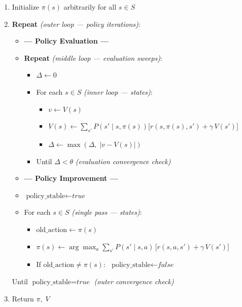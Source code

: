 \documentclass[11pt]{article}
\providecommand{\tightlist}{%
      \setlength{\itemsep}{0pt}\setlength{\parskip}{0pt}}
\begin{document}
\begin{enumerate}
\def\labelenumi{\arabic{enumi}.}
\item
  Initialize \(\pi(s)\) arbitrarily for all \(s \in S\)
\item
  \textbf{Repeat} \emph{(outer loop --- policy iterations)}:

  \begin{itemize}
  \item
    \textbf{--- Policy Evaluation ---}
  \item
    \textbf{Repeat} \emph{(middle loop --- evaluation sweeps)}:

    \begin{itemize}
    \tightlist
    \item
      \(\Delta \leftarrow 0\)
    \item
      For each \(s \in S\) \emph{(inner loop --- states)}:

      \begin{itemize}
      \tightlist
      \item
        \(v \leftarrow V(s)\)
      \item
        \(\displaystyle V(s) \leftarrow \sum_{s'} P\!\left(s' \mid s,\pi(s)\right)\bigl[r(s,\pi(s),s') + \gamma\, V(s')\bigr]\)
      \item
        \(\Delta \leftarrow \max(\Delta,\; |v - V(s)|)\)
      \end{itemize}
    \item
      Until \(\Delta < \theta\) \emph{(evaluation convergence check)}
    \end{itemize}
  \item
    \textbf{--- Policy Improvement ---}
  \item
    \(\text{policy\_stable} \leftarrow \textit{true}\)
  \item
    For each \(s \in S\) \emph{(single pass --- states)}:

    \begin{itemize}
    \tightlist
    \item
      \(\text{old\_action} \leftarrow \pi(s)\)
    \item
      \(\displaystyle \pi(s) \leftarrow \arg\max_a \sum_{s'} P(s' \mid s,a)\,\bigl[r(s,a,s') + \gamma\, V(s')\bigr]\)
    \item
      If \(\text{old\_action} \neq \pi(s)\):
      \(\;\text{policy\_stable} \leftarrow \textit{false}\)
    \end{itemize}
  \end{itemize}

  Until \(\text{policy\_stable} = \textit{true}\) \emph{(outer
  convergence check)}
\item
  Return \(\pi,\; V\)
\end{enumerate}
\end{document}
